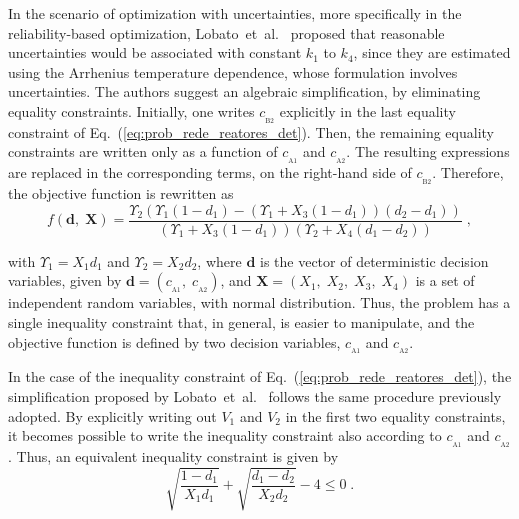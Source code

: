 \documentclass[final,5p,times,twocolumn,numbers]{elsarticle}
\begin{document}
In the scenario of optimization with uncertainties, more specifically in the reliability-based optimization, Lobato~et~al.~\cite{bib:lobato2019} proposed that reasonable uncertainties would be associated with constant $ k_{1} $ to $ k_{4} $, since they are estimated using the Arrhenius temperature dependence, whose formulation involves uncertainties. The authors suggest an algebraic simplification, by eliminating equality constraints. Initially, one writes $ c_{_{\mathrm{B} 2}} $ explicitly in the last equality constraint of Eq.~(\ref{eq:prob_rede_reatores_det}). Then, the remaining equality constraints are written only as a function of $ c_{_{\mathrm{A} 1}} $ and $ c_{_{\mathrm{A} 2}} $. The resulting expressions are replaced in the corresponding terms, on the right-hand side of $ c_{_{\mathrm{B} 2}} $. Therefore, the objective function is rewritten as
%
\begin{equation} \label{eq:fobj_simp_rede_reatores}
f \left( \mathbf{d}, \; \mathbf{X} \right) = \dfrac{\Upsilon_{2} \left( \Upsilon_{1} \left( 1 - d_{1} \right) - \left( \Upsilon_{1} + X_{3} \left( 1 - d_{1} \right) \right) \left( d_{2} - d_{1} \right) \right)}{\left( \Upsilon_{1} + X_{3} \left( 1 - d_{1} \right) \right) \left( \Upsilon_{2} + X_{4} \left( d_{1} - d_{2} \right) \right)} \; ,
\end{equation}

\noindent with $ \Upsilon_{1} = X_{1} d_{1} $ and $ \Upsilon_{2} = X_{2} d_{2} $, where $ \mathbf{d} $ is the vector of deterministic decision variables, given by $ \mathbf{d} = \left( c_{_{\mathrm{A} 1}}, \; c_{_{\mathrm{A} 2}} \right) $, and $ \mathbf{X} = \left( X_{1}, \; X_{2}, \; X_{3}, \; X_{4} \right) $ is a set of independent random variables, with normal distribution. Thus, the problem has a single inequality constraint that, in general, is easier to manipulate, and the objective function is defined by two decision variables, $ c_{_{\mathrm{A} 1}} $ and $ c_{_{\mathrm{A} 2}} $.

In the case of the inequality constraint of Eq.~(\ref{eq:prob_rede_reatores_det}), the simplification proposed by Lobato~et~al.~\cite{bib:lobato2019} follows the same procedure previously adopted. By explicitly writing out $ V_{1} $ and $ V_{2} $ in the first two equality constraints, it becomes possible to write the inequality constraint also according to $ c_{_{\mathrm{A} 1}} $ and $ c_{_{\mathrm{A} 2}} $. Thus, an equivalent inequality constraint is given by
%
\begin{equation} \label{eq:rest_des_simp_rede_reatores}
\sqrt{\dfrac{1 - d_{1}}{X_{1} d_{1}}} + \sqrt{\dfrac{d_{1} - d_{2}}{X_{2} d_{2}}} - 4 \leq 0 \; .
\end{equation}
\end{document}
